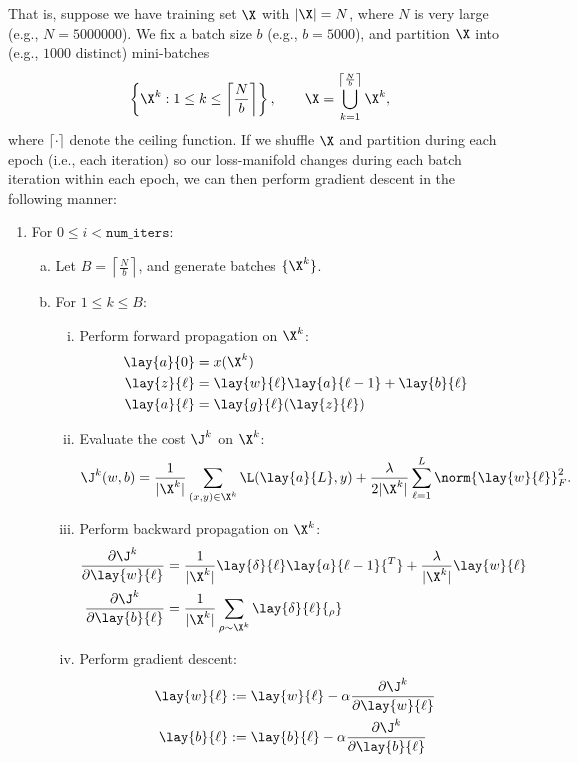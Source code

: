 That is, suppose we have training set $\X$ with $|\X|=N$, where $N$ is very large (e.g., $N=5000000$).  We fix a batch size $b$ (e.g., $b=5000$), and partition $\X$ into (e.g., $1000$ distinct) mini-batches
$$\left\{\X^k:1\leq k\leq \left\lceil\frac{N}{b}\right\rceil\right\},\qquad\X=\bigcup_{k=1}^{\left\lceil\frac{N}{b}\right\rceil}\X^k,$$
where $\lceil\cdot\rceil$ denote the ceiling function.  If we shuffle $\X$ and partition during each epoch (i.e., each iteration) so our loss-manifold changes during each batch iteration within each epoch, we can then perform gradient descent in the following manner:
\begin{enumerate}[1.]
	\item For $0\leq i<\texttt{num\_iters}$:
		\begin{enumerate}[a.]
			\item Let $B=\left\lceil\frac{N}{b}\right\rceil$, and generate batches $\{\X^k\}$.
			\item For $1\leq k\leq B$:
			\begin{enumerate}[i.]
				\item Perform forward propagation on $\X^k$:
				\begin{align*}
					\lay{a}{0}&=x(\X^k)\\
					\lay{z}{\ell}&=\lay{w}{\ell}\lay{a}{\ell-1}+\lay{b}{\ell}\\
					\lay{a}{\ell}&=\lay{g}{\ell}(\lay{z}{\ell})
				\end{align*}
				\item Evaluate the cost $\J^k$ on $\X^k$:
				$$\J^k(w,b)=\frac{1}{|\X^k|}\sum_{(x,y)\in\X^k}\L(\lay{a}{L},y)+\frac{\lambda}{2|\X^k|}\sum_{\ell=1}^L\norm{\lay{w}{\ell}}_F^2.$$
				\item Perform backward propagation on $\X^k$:
				\begin{align*}
					\frac{\partial\J^k}{\partial\lay{w}{\ell}}&=\frac{1}{|\X^k|}\lay{\delta}{\ell}\lay{a}{\ell - 1}{^T}+\frac{\lambda}{|\X^k|}\lay{w}{\ell}\\
					\frac{\partial\J^k}{\partial\lay{b}{\ell}}&=\frac{1}{|\X^k|}\sum_{\rho\sim\X^k}\lay{\delta}{\ell}{_\rho}
				\end{align*}
				\item Perform gradient descent:
				\begin{align*}
					\lay{w}{\ell}&:=\lay{w}{\ell}-\alpha \frac{\partial\J^k}{\partial\lay{w}{\ell}}\\
					\lay{b}{\ell}&:=\lay{b}{\ell}-\alpha \frac{\partial\J^k}{\partial\lay{b}{\ell}}
				\end{align*}
			\end{enumerate}
		\end{enumerate}
\end{enumerate}

